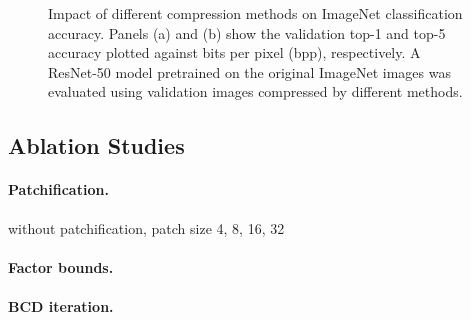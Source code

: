 \begin{figure}[t]
	\centering
	\begin{subfigure}{.5\textwidth}
		\centering
		\caption{}
		\label{fig: top1-vs-bpp imagenet}
	\end{subfigure}%
	\begin{subfigure}{.5\textwidth}
		\centering
		\caption{}
		\label{fig: top5-vs-bpp imagenet}
	\end{subfigure}
	\caption{Impact of different compression methods on ImageNet classification accuracy. Panels (a) and (b) show the validation top-1 and top-5 accuracy plotted against bits per pixel (bpp), respectively. A ResNet-50 model pretrained on the original ImageNet images was evaluated using validation images compressed by different methods.}
	
	\label{fig: compression impact on imagenet classification}
\end{figure}


\subsection{Ablation Studies} \label{sec: ablation studies}


\paragraph{Patchification.} 

without patchification, patch size 4, 8, 16, 32

\paragraph{Factor bounds.} 

\paragraph{BCD iteration.}


